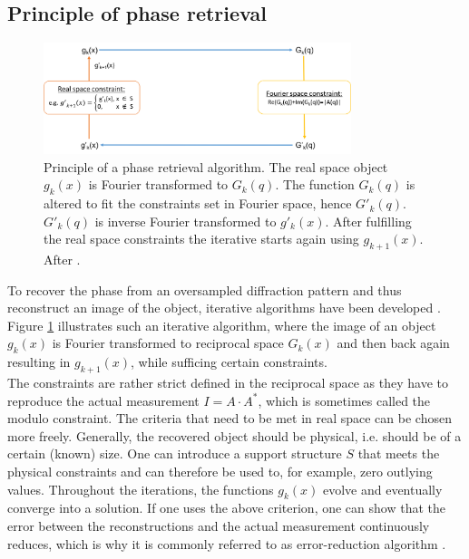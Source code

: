 \subsection{Principle of phase retrieval}\label{sec:phase-retrieval-fundamental}
\begin{figure}
	\centering
		\includegraphics[width=0.80\textwidth]{images/phase-retrieval-algorithm.png}
	\caption[Example of a phase retrieval algorithm.]{Principle of a phase retrieval algorithm. The real space object $g_{k}\left(x\right)$ is Fourier transformed to $G_{k}\left(q\right)$. The function $G_{k}\left(q\right)$ is altered to fit the constraints set in Fourier space, hence $G'_{k}\left(q\right)$. $G'_{k}\left(q\right)$ is inverse Fourier transformed to $g'_{k}\left(x\right)$. After fulfilling the real space constraints the iterative starts again using $g_{k+1}\left(x\right)$. After \citep{Fienup-1982-AO}.}
	\label{fig:phase-retrieval-algorithm}
\end{figure}
To recover the phase from an oversampled diffraction pattern and thus reconstruct an image of the object, iterative algorithms have been developed \cite{Fienup-1982-AO}. Figure \ref{fig:phase-retrieval-algorithm} illustrates such an iterative algorithm, where the image of an object $g_{k}\left(x\right)$ is Fourier transformed to reciprocal space $G_{k}\left(x\right)$ and then back again resulting in $g_{k+1}(x)$, while sufficing certain constraints.\\
The constraints are rather strict defined in the reciprocal space as they have to reproduce the actual measurement $I=A\cdot A^{*}$, which is sometimes called the modulo constraint. The criteria that need to be met in real space can be chosen more freely. Generally, the recovered object should be physical, i.e. should be of a certain (known) size. One can introduce a support structure $S$ that meets the physical constraints and can therefore be used to, for example, zero outlying values. Throughout the iterations, the functions $g_{k}(x)$ evolve and eventually converge into a solution. If one uses the above criterion, one can show that the error between the reconstructions and the actual measurement continuously reduces, which is why it is commonly referred to as error-reduction algorithm \cite{Fienup-1978-OL}.
%
%
%
%
